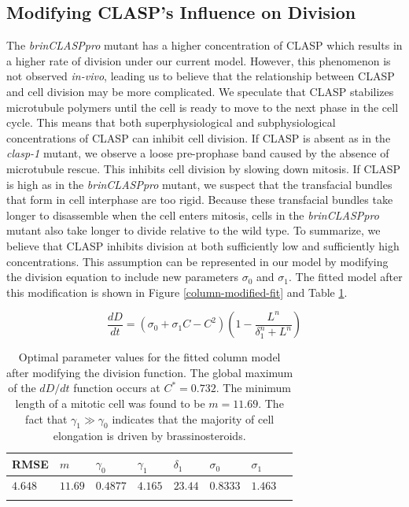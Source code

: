 \documentclass[referee,pdflatex,sn-mathphys-num]{sn-jnl}
\begin{document}
\subsection{Modifying CLASP's Influence on Division} 

The \emph{brinCLASPpro} mutant has a higher concentration of CLASP which results in a higher rate of division under our current model.
However, this phenomenon is not observed \emph{in-vivo}, leading us to believe that the relationship between CLASP and cell division may be more complicated.
We speculate that CLASP stabilizes microtubule polymers until the cell is ready to move to the next phase in the cell cycle.
This means that both superphysiological and subphysiological concentrations of CLASP can inhibit cell division.
If CLASP is absent as in the \emph{clasp-1} mutant, we observe a loose pre-prophase band \cite{ambrose2007} caused by the absence of microtubule rescue.
This inhibits cell division by slowing down mitosis.
If CLASP is high as in the \emph{brinCLASPpro} mutant, we suspect that the transfacial bundles that form in cell interphase are too rigid.
Because these transfacial bundles take longer to disassemble when the cell enters mitosis, cells in the \emph{brinCLASPpro} mutant also take longer to divide relative to the wild type.
To summarize, we believe that CLASP inhibits division at both sufficiently low and sufficiently high concentrations.
This assumption can be represented in our model by modifying the division equation to include new parameters $\sigma_{0}$ and $\sigma_{1}$.
The fitted model after this modification is shown in Figure \ref{column-modified-fit} and Table \ref{column-modified-parameters}.

\begin{equation}
\label{division-modified}
\frac{dD}{dt} = \left( \sigma_{0} + \sigma_{1}C - C^{2} \right)\left( 1 - \frac{L^{n}}{\delta_{1}^{n} + L^{n}} \right) 
\end{equation}


\begin{table}[!ht]
\centering
\caption{Optimal parameter values for the fitted column model after modifying the division function.
The global maximum of the $dD/dt$ function occurs at $C^{*} = 0.732$.
The minimum length of a mitotic cell was found to be $m = 11.69$.
The fact that $\gamma_{1} \gg \gamma_{0}$ indicates that the majority of cell elongation is driven by brassinosteroids. }
\label{column-modified-parameters}
\begin{tabular}{@{}llllllll@{}}
\toprule
RMSE & $m$ & $\gamma_{0}$ & $\gamma_{1}$ & $\delta_{1}$ & $\sigma_{0}$ & $\sigma_{1}$ \\
\midrule
$4.648$ & $11.69$ & $0.4877$ & $4.165$ & $23.44$ & $0.8333$ & $1.463$ \\
\botrule
\end{tabular}
\end{table}
\end{document}
